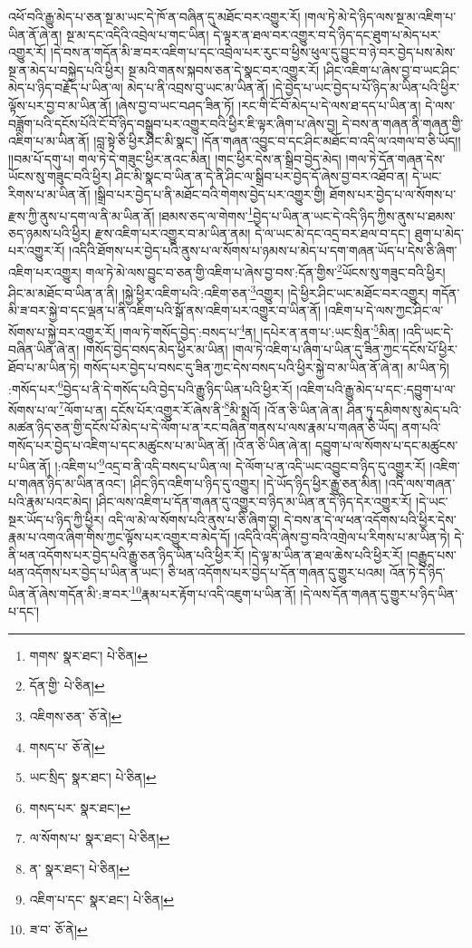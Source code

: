 འཕོ་བའི་རྒྱུ་མེད་པ་ཅན་སྔ་མ་ཡང་དེ་ཁོ་ན་བཞིན་དུ་མཐོང་བར་འགྱུར་རོ། །གལ་ཏེ་མེ་དེ་ཉིད་ལས་སྔ་མ་འཇིག་པ་ཡིན་ནོ་ཞེ་ན། སྔ་མ་དང་འདིའི་འབྲེལ་པ་གང་ཡིན། དེ་ལྟར་ན་ཐལ་བར་འགྱུར་བ་དེ་ཉིད་དང་ཐུག་པ་མེད་པར་འགྱུར་རོ། །དེ་བས་ན་གདོན་མི་ཟ་བར་འཇིག་པ་དང་འབྲེལ་པར་རུང་བ་ཕྱིས་ཕུལ་དུ་བྱུང་བ་ཉེ་བར་བྱེད་པས་མེས་སྔ་ན་མེད་པ་བསྐྱེད་པའི་ཕྱིར། སྔ་མའི་གནས་སྐབས་ཅན་དེ་སྣང་བར་འགྱུར་རོ། །ཤིང་འཇིག་པ་ཞེས་བྱ་བ་ཡང་ཤིང་མེད་པ་ཉིད་བརྗོད་པ་ཡིན་ལ། མེད་པ་ནི་འབྲས་བུ་ཡང་མ་ཡིན་ནོ། །དེ་བྱེད་པ་ཡང་བྱེད་པ་པོ་ཉིད་མ་ཡིན་པའི་ཕྱིར་ལྟོས་པར་བྱ་བ་མ་ཡིན་ནོ། །ཞེས་བྱ་བ་ཡང་བཤད་ཟིན་ཏོ། །རང་གི་ངོ་བོ་མེད་པ་དེ་ལས་ཐ་དད་པ་ཡིན་ན། དེ་ལས་བཟློག་པའི་དངོས་པོའི་ངོ་བོ་ཉིད་བསྒྲུབ་པར་འགྱུར་བའི་ཕྱིར་ཇི་ལྟར་ཞིག་པ་ཞེས་བྱ། དེ་བས་ན་གཞན་ནི་གཞན་གྱི་འཇིག་པ་མ་ཡིན་ནོ། །བླ་སྟེ་ཅི་ཕྱིར་ཤིང་མི་སྣང་། །དོན་གཞན་འབྱུང་བ་དང་ཤིང་མཐོང་བ་འདི་ལ་འགལ་བ་ཅི་ཡོད།། །།བམ་པོ་དགུ་པ། གལ་ཏེ་དེ་གཟུང་ཕྱིར་ནའང་མིན། །གང་ཕྱིར་དེས་ན་སྒྲིབ་བྱེད་མེད། །གལ་ཏེ་དོན་གཞན་དེས་ཡོངས་སུ་གཟུང་བའི་ཕྱིར། ཤིང་མི་སྣང་བ་ཡིན་ན་དེ་ནི་ཤིང་ལ་སྒྲིབ་པར་བྱེད་དོ་ཞེས་བྱ་བར་འཐོབ་ན། དེ་ཡང་རིགས་པ་མ་ཡིན་ནོ། །སྒྲིབ་པར་བྱེད་པ་ནི་མཐོང་བའི་གེགས་བྱེད་པར་འགྱུར་གྱི། ཐོགས་པར་བྱེད་པ་ལ་སོགས་པ་རྫས་ཀྱི་ནུས་པ་དག་ལ་ནི་མ་ཡིན་ནོ། །ཐམས་ཅད་ལ་གེགས་\footnote{གགས་  སྣར་ཐང་།  པེ་ཅིན། }བྱེད་པ་ཡིན་ན་ཡང་དེ་འདི་ཉིད་ཀྱིས་ནུས་པ་ཐམས་ཅད་ཉམས་པའི་ཕྱིར། རྫས་འཇིག་པར་འགྱུར་བ་མ་ཡིན་ནམ། དེ་ལ་ཡང་མེ་དང་འདྲ་བར་ཐལ་བ་དང་། ཐུག་པ་མེད་པར་འགྱུར་རོ། །འདིའི་ཐོགས་པར་བྱེད་པའི་ནུས་པ་ལ་སོགས་པ་ཉམས་པ་མེད་པ་དག་གཞན་ཡོད་པ་དེས་ཅི་ཞིག་འཇིག་པར་འགྱུར། གལ་ཏེ་མེ་ལས་བྱུང་བ་ཅན་གྱི་འཇིག་པ་ཞེས་བྱ་བས་:དོན་གྱིས་\footnote{དོན་གྱི་  པེ་ཅིན། }ཡོངས་སུ་གཟུང་བའི་ཕྱིར། ཤིང་མ་མཐོང་བ་ཡིན་ན་ནི། །སྐྱེ་ཕྱིར་འཇིག་པའི་:འཇིག་ཅན་\footnote{འཇིགས་ཅན་  ཅོ་ནེ། }འགྱུར། །དེ་ཕྱིར་ཤིང་ཡང་མཐོང་བར་འགྱུར། གདོན་མི་ཟ་བར་སྐྱེ་བ་དང་ལྡན་པ་ནི་འཇིག་པའི་སྒོ་ནས་འཇིག་པར་འགྱུར་བ་ཡིན་ནོ། །འཇིག་པ་དེ་ལས་ཀྱང་ཤིང་ལ་སོགས་པ་སྐྱེ་བར་འགྱུར་རོ། །གལ་ཏེ་གསོད་བྱེད་:བསད་པ་\footnote{གསད་པ་  ཅོ་ནེ། }ན། །དཔེར་ན་ནག་པ་:ཡང་སྲིན་\footnote{ཡང་སྲིད་  སྣར་ཐང་།  པེ་ཅིན། }མིན། །འདི་ཡང་དེ་བཞིན་ཡིན་ཞེ་ན། །གསོད་བྱེད་བསད་མེད་ཕྱིར་མ་ཡིན། །གལ་ཏེ་འཇིག་པ་ཞིག་པ་ཡིན་དུ་ཟིན་ཀྱང་དངོས་པོ་ཕྱིར་ཐོབ་པ་མ་ཡིན་ཏེ། གསོད་པར་བྱེད་པ་བསང་དུ་ཟིན་ཀྱང་དེས་བསད་པའི་ཕྱིར་སྐྱེ་བ་མ་ཡིན་ནོ་ཞེ་ན། མ་ཡིན་ཏེ། :གསོད་པར་\footnote{གསད་པར་  སྣར་ཐང་། }བྱེད་པ་ནི་དེ་གསོད་པའི་བྱེད་པའི་རྒྱུ་ཉིད་ཡིན་པའི་ཕྱིར་རོ། །འཇིག་པའི་རྒྱུ་མེད་པ་དང་:དབྱུག་པ་ལ་སོགས་པ་ལ་\footnote{ལ་སོགས་པ་  སྣར་ཐང་།  པེ་ཅིན། }ལོག་པ་ན། དངོས་པོར་འགྱུར་རོ་ཞེས་ནི་\footnote{ན་  སྣར་ཐང་།  པེ་ཅིན། }མི་སྨྲའོ། །འོ་ན་ཅི་ཡིན་ཞེ་ན། ཤིན་ཏུ་དམིགས་སུ་མེད་པའི་མཚན་ཉིད་ཅན་གྱི་དངོས་པོ་མེད་པ་དེ་ལོག་པ་ན་རང་བཞིན་གནས་པ་ལས་རྣམ་པ་གཞན་ཅི་ཡོད། ནག་པའི་གསོད་པར་བྱེད་པ་འཇིག་པ་དང་མཚུངས་པ་མ་ཡིན་ནོ། །འོ་ན་ཅི་ཡིན་ཞེ་ན། དབྱུག་པ་ལ་སོགས་པ་དང་མཚུངས་པ་ཡིན་ནོ། །:འཇིག་པ་\footnote{འཇིག་པ་དང་  སྣར་ཐང་།  པེ་ཅིན། }འདྲ་བ་ནི་འདི་བསད་པ་ཡིན་ལ། དེ་ལོག་པ་ན་འདི་ཡང་འབྱུང་བ་ཉིད་དུ་འགྱུར་རོ། །འཇིག་པ་གཞན་ཉིད་མ་ཡིན་ནའང་། །ཤིང་ཉིད་འཇིག་པ་ཉིད་དུ་འགྱུར། །དེ་ཡོད་ཉིད་ཕྱིར་རྒྱུ་ཅན་མིན། །འདི་ལས་གཞན་པའི་རྣམ་པའང་མེད། །ཤིང་ལས་འཇིག་པ་དོན་གཞན་དུ་འགྱུར་བ་ཉིད་མ་ཡིན་ན་དེ་ཉིད་དེར་འགྱུར་རོ། །དེ་ཡང་སྔར་ཡོད་པ་ཉིད་ཀྱི་ཕྱིར། འདི་ལ་མེ་ལ་སོགས་པའི་ནུས་པ་ཅི་ཞིག་བྱ། དེ་བས་ན་དེ་ལ་ཕན་འདོགས་པའི་ཕྱིར་དེས་རྣམ་པ་འགའ་ཞིག་གིས་ཀྱང་ལྟོས་པར་འགྱུར་བ་མེད་དོ། །འདིའི་འདི་ཞེས་བྱ་བའི་འགྲེལ་པ་རིགས་པ་མ་ཡིན་ཏེ། དེ་ནི་ཕན་འདོགས་པར་བྱེད་པའི་རྒྱུ་ཅན་ཉིད་ཡིན་པའི་ཕྱིར་རོ། །དེ་ལྟ་མ་ཡིན་ན་ཐལ་ཆེས་པའི་ཕྱིར་རོ། །བརྒྱུད་པས་ཕན་འདོགས་པར་བྱེད་པ་ཡིན་ན་ཡང་། ཅི་ཕན་འདོགས་པར་བྱེད་པ་དོན་གཞན་དུ་གྱུར་པའམ། འོན་ཏེ་དེ་ཉིད་ཡིན་ནོ་ཞེས་གདོན་མི་:ཟ་བར་\footnote{ཟ་བ་  ཅོ་ནེ། }རྣམ་པར་རྟོག་པ་འདི་འཇུག་པ་ཡིན་ནོ། །དེ་ལས་དོན་གཞན་དུ་གྱུར་པ་ཉིད་ཡིན་པ་དང་། 